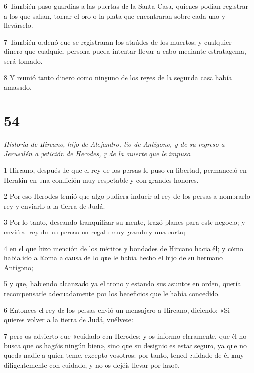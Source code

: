 \par 6 También puso guardias a las puertas de la Santa Casa, quienes podían registrar a los que salían, tomar el oro o la plata que encontraran sobre cada uno y llevárselo.

\par 7 También ordenó que se registraran los ataúdes de los muertos; y cualquier dinero que cualquier persona pueda intentar llevar a cabo mediante estratagema, será tomado.

\par 8 Y reunió tanto dinero como ninguno de los reyes de la segunda casa había amasado.

\chapter{54}

\par \textit{Historia de Hircano, hijo de Alejandro, tío de Antígono, y de su regreso a Jerusalén a petición de Herodes, y de la muerte que le impuso.}

\par 1 Hircano, después de que el rey de los persas lo puso en libertad, permaneció en Herakin en una condición muy respetable y con grandes honores.

\par 2 Por eso Herodes temió que algo pudiera inducir al rey de los persas a nombrarlo rey y enviarlo a la tierra de Judá.

\par 3 Por lo tanto, deseando tranquilizar su mente, trazó planes para este negocio; y envió al rey de los persas un regalo muy grande y una carta;

\par 4 en el que hizo mención de los méritos y bondades de Hircano hacia él; y cómo había ido a Roma a causa de lo que le había hecho el hijo de su hermano Antígono;

\par 5 y que, habiendo alcanzado ya el trono y estando sus asuntos en orden, quería recompensarle adecuadamente por los beneficios que le había concedido.

\par 6 Entonces el rey de los persas envió un mensajero a Hircano, diciendo: «Si quieres volver a la tierra de Judá, vuélvete:

\par 7 pero os advierto que «cuidado con Herodes; y os informo claramente, que él no busca que os hagáis ningún bien», sino que su designio es estar seguro, ya ​​que no queda nadie a quien teme, excepto vosotros: por tanto, tened cuidado de él muy diligentemente con cuidado, y no os dejéis llevar por lazo».

